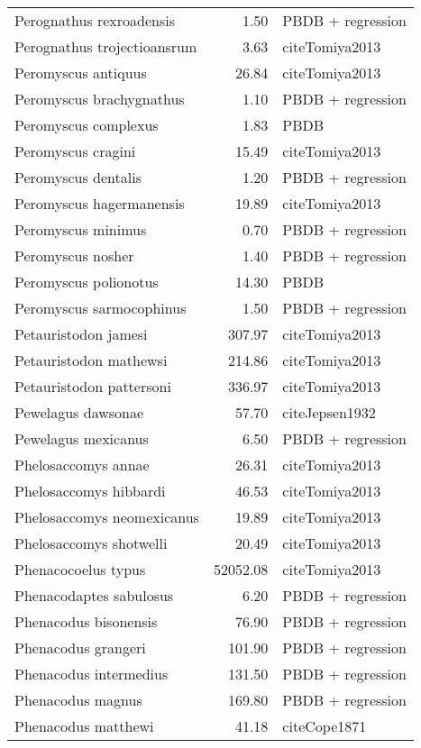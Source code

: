 \begin{table}[ht]
\begin{tabular}{lrl}
  Perognathus rexroadensis & 1.50 & PBDB + regression \\ 
  Perognathus trojectioansrum & 3.63 & cite{Tomiya2013} \\ 
  Peromyscus antiquus & 26.84 & cite{Tomiya2013} \\ 
  Peromyscus brachygnathus & 1.10 & PBDB + regression \\ 
  Peromyscus complexus & 1.83 & PBDB \\ 
  Peromyscus cragini & 15.49 & cite{Tomiya2013} \\ 
  Peromyscus dentalis & 1.20 & PBDB + regression \\ 
  Peromyscus hagermanensis & 19.89 & cite{Tomiya2013} \\ 
  Peromyscus minimus & 0.70 & PBDB + regression \\ 
  Peromyscus nosher & 1.40 & PBDB + regression \\ 
  Peromyscus polionotus & 14.30 & PBDB \\ 
  Peromyscus sarmocophinus & 1.50 & PBDB + regression \\ 
  Petauristodon jamesi & 307.97 & cite{Tomiya2013} \\ 
  Petauristodon mathewsi & 214.86 & cite{Tomiya2013} \\ 
  Petauristodon pattersoni & 336.97 & cite{Tomiya2013} \\ 
  Pewelagus dawsonae & 57.70 & cite{Jepsen1932} \\ 
  Pewelagus mexicanus & 6.50 & PBDB + regression \\ 
  Phelosaccomys annae & 26.31 & cite{Tomiya2013} \\ 
  Phelosaccomys hibbardi & 46.53 & cite{Tomiya2013} \\ 
  Phelosaccomys neomexicanus & 19.89 & cite{Tomiya2013} \\ 
  Phelosaccomys shotwelli & 20.49 & cite{Tomiya2013} \\ 
  Phenacocoelus typus & 52052.08 & cite{Tomiya2013} \\ 
  Phenacodaptes sabulosus & 6.20 & PBDB + regression \\ 
  Phenacodus bisonensis & 76.90 & PBDB + regression \\ 
  Phenacodus grangeri & 101.90 & PBDB + regression \\ 
  Phenacodus intermedius & 131.50 & PBDB + regression \\ 
  Phenacodus magnus & 169.80 & PBDB + regression \\ 
  Phenacodus matthewi & 41.18 & cite{Cope1871} \\ 

\end{tabular}
\end{table}
